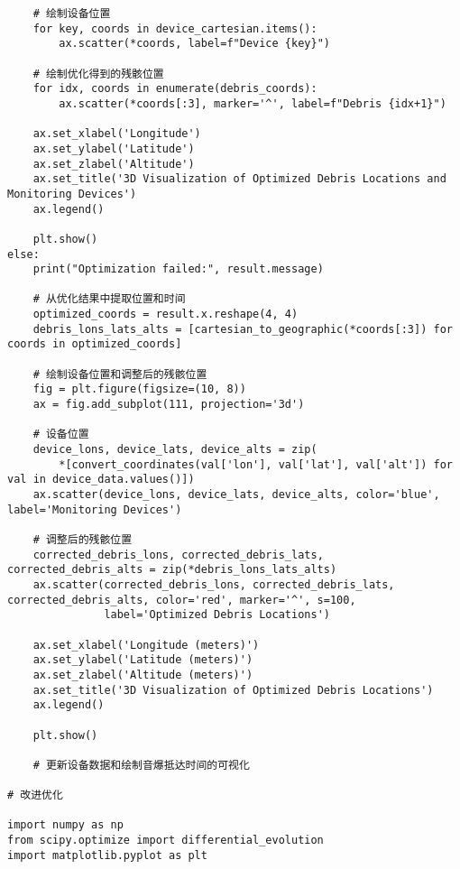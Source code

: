 \documentclass[withoutpreface,bwprint,12pt,a4paper]{cumcmthesis}
\begin{document}
\begin{appendices}
\begin{lstlisting}
    # 绘制设备位置
    for key, coords in device_cartesian.items():
        ax.scatter(*coords, label=f"Device {key}")

    # 绘制优化得到的残骸位置
    for idx, coords in enumerate(debris_coords):
        ax.scatter(*coords[:3], marker='^', label=f"Debris {idx+1}")

    ax.set_xlabel('Longitude')
    ax.set_ylabel('Latitude')
    ax.set_zlabel('Altitude')
    ax.set_title('3D Visualization of Optimized Debris Locations and Monitoring Devices')
    ax.legend()

    plt.show()
else:
    print("Optimization failed:", result.message)

    # 从优化结果中提取位置和时间
    optimized_coords = result.x.reshape(4, 4)
    debris_lons_lats_alts = [cartesian_to_geographic(*coords[:3]) for coords in optimized_coords]

    # 绘制设备位置和调整后的残骸位置
    fig = plt.figure(figsize=(10, 8))
    ax = fig.add_subplot(111, projection='3d')

    # 设备位置
    device_lons, device_lats, device_alts = zip(
        *[convert_coordinates(val['lon'], val['lat'], val['alt']) for val in device_data.values()])
    ax.scatter(device_lons, device_lats, device_alts, color='blue', label='Monitoring Devices')

    # 调整后的残骸位置
    corrected_debris_lons, corrected_debris_lats, corrected_debris_alts = zip(*debris_lons_lats_alts)
    ax.scatter(corrected_debris_lons, corrected_debris_lats, corrected_debris_alts, color='red', marker='^', s=100,
               label='Optimized Debris Locations')

    ax.set_xlabel('Longitude (meters)')
    ax.set_ylabel('Latitude (meters)')
    ax.set_zlabel('Altitude (meters)')
    ax.set_title('3D Visualization of Optimized Debris Locations')
    ax.legend()

    plt.show()

    # 更新设备数据和绘制音爆抵达时间的可视化

# 改进优化

import numpy as np
from scipy.optimize import differential_evolution
import matplotlib.pyplot as plt


\end{lstlisting}
\end{appendices}
\end{document}
